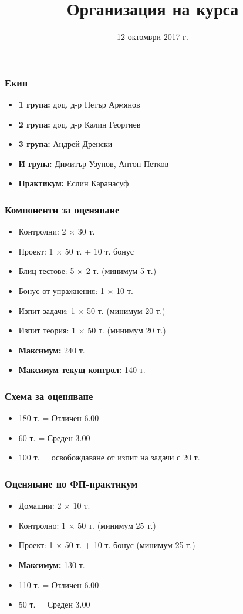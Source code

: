 \documentclass{beamer}
\title{Организация на курса}
\date{12 октомври 2017 г.}
\begin{document}
\begin{frame}
  \titlepage
\end{frame}

\begin{frame}
  \frametitle{Екип}

  \begin{itemize}
  \item \textbf{1 група:} доц. д-р Петър Армянов
  \item \textbf{2 група:} доц. д-р Калин Георгиев
  \item \textbf{3 група:} Андрей Дренски
  \item \textbf{И група:} Димитър Узунов, Антон Петков 
  \item \textbf{Практикум:} Еслин Каранасуф
  \end{itemize}
\end{frame}

\begin{frame}
  \frametitle{Компоненти за оценяване}

  \begin{itemize}
  \item Контролни: 2 $\times$ 30 т.
  \item Проект: 1 $\times$ 50 т. + 10 т. бонус
  \item Блиц тестове: 5 $\times$ 2 т. \alert{(минимум 5 т.)}
  \item Бонус от упражнения: 1 $\times$ 10 т.
  \item Изпит задачи: 1 $\times$ 50 т. \alert{(минимум 20 т.)}
  \item Изпит теория: 1 $\times$ 50 т. \alert{(минимум 20 т.)}
  \item \textbf{Максимум:} 240 т.
  \item \textbf{Максимум текущ контрол:} 140 т.
  \end{itemize}
\end{frame}

\begin{frame}
  \frametitle{Схема за оценяване}

  \begin{itemize}
  \item 180 т. = Отличен 6.00
  \item 60 т. = Среден 3.00
  \item 100 т. = освобождаване от изпит на задачи с 20 т.
  \end{itemize}
\end{frame}

\begin{frame}
  \frametitle{Оценяване по ФП-практикум}

  \begin{itemize}
  \item Домашни: 2 $\times$ 10 т.
  \item Контролно: 1 $\times$ 50 т. \alert{(минимум 25 т.)}
  \item Проект: 1 $\times$ 50 т. + 10 т. бонус \alert{(минимум 25 т.)}
  \item \textbf{Максимум:} 130 т.
  \item 110 т. = Отличен 6.00
  \item 50 т. = Среден 3.00
  \end{itemize}
\end{frame}
\end{document}
